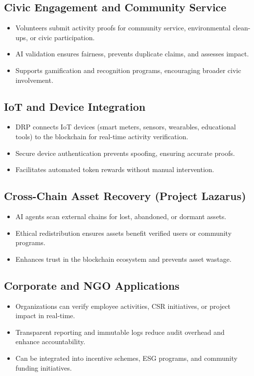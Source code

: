 \documentclass[11pt,a4paper]{article}
\begin{document}
\subsection{Civic Engagement and Community Service}
\begin{itemize}
    \item Volunteers submit activity proofs for community service, environmental clean-ups, or civic participation.  
    \item AI validation ensures fairness, prevents duplicate claims, and assesses impact.  
    \item Supports gamification and recognition programs, encouraging broader civic involvement.  
\end{itemize}

\subsection{IoT and Device Integration}
\begin{itemize}
    \item DRP connects IoT devices (smart meters, sensors, wearables, educational tools) to the blockchain for real-time activity verification.  
    \item Secure device authentication prevents spoofing, ensuring accurate proofs.  
    \item Facilitates automated token rewards without manual intervention.  
\end{itemize}

\subsection{Cross-Chain Asset Recovery (Project Lazarus)}
\begin{itemize}
    \item AI agents scan external chains for lost, abandoned, or dormant assets.  
    \item Ethical redistribution ensures assets benefit verified users or community programs.  
    \item Enhances trust in the blockchain ecosystem and prevents asset wastage.  
\end{itemize}

\subsection{Corporate and NGO Applications}
\begin{itemize}
    \item Organizations can verify employee activities, CSR initiatives, or project impact in real-time.  
    \item Transparent reporting and immutable logs reduce audit overhead and enhance accountability.  
    \item Can be integrated into incentive schemes, ESG programs, and community funding initiatives.  
\end{itemize}
\end{document}

